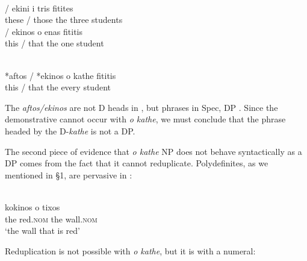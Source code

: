 \documentclass[output=paper,
modfonts
]{langscibook}
\begin{document}
\ea\label{ex:etxeberria:26} \\
\ea
{} \textnormal{/} {ekini} {i} {tris} {fitites}\\
these / those the three students\\
\ex
{} \textnormal{/} {ekinos} {o} {enas} {fititis}\\
this / that the one student\\
\z
\z

\ea\label{ex:etxeberria:27} \\
\gll \textnormal{*}{aftos} \textnormal{/} \textnormal{*}{ekinos} {o} {kathe} {fititis}\\
\phantom{*}this / \phantom{*}that the every student\\
\z

The  \textit{aftos/ekinos} are not D heads in , but phrases in {\ob}Spec, DP{\cb} \citep{stavrou-horrocks1989}. Since the demonstrative cannot occur with \textit{o kathe}, we must conclude that the phrase headed by the D-\textit{kathe} is not a DP.

The second piece of evidence that \textit{o kathe} NP does not behave syntactically as a DP comes from the fact that it cannot reduplicate. Polydefinites, as we mentioned in \S1, are pervasive in  \citep[see][]{AlexiadouWilder1998b, CamposStravrou2004, kolliakou2004, ioannidou-dendikken2006, lekakou-szendroi2007}:

\ea\label{ex:etxeberria:28} \\
 {kokinos} {o} {tixos}\\
the red.\textsc{nom} the wall.\textsc{nom}\\
\glt `the wall that is red'
\z

Reduplication is not possible with \textit{o kathe}, but it is with a numeral:

\ea\label{ex:etxeberria:29} \\
\z
\z
\end{document}
